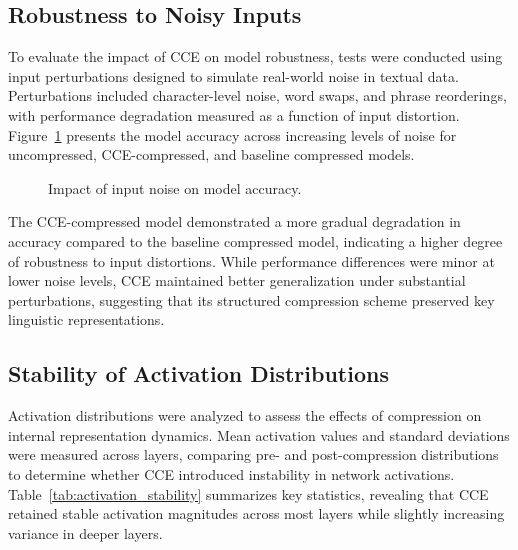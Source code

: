 \documentclass{article}
\begin{document}
\subsection{Robustness to Noisy Inputs}

To evaluate the impact of CCE on model robustness, tests were conducted using input perturbations designed to simulate real-world noise in textual data. Perturbations included character-level noise, word swaps, and phrase reorderings, with performance degradation measured as a function of input distortion. Figure~\ref{fig:noise_robustness} presents the model accuracy across increasing levels of noise for uncompressed, CCE-compressed, and baseline compressed models.

\begin{figure}[t]
	\centering
	\caption{Impact of input noise on model accuracy.}
	\label{fig:noise_robustness}
\end{figure}

The CCE-compressed model demonstrated a more gradual degradation in accuracy compared to the baseline compressed model, indicating a higher degree of robustness to input distortions. While performance differences were minor at lower noise levels, CCE maintained better generalization under substantial perturbations, suggesting that its structured compression scheme preserved key linguistic representations.

\subsection{Stability of Activation Distributions}

Activation distributions were analyzed to assess the effects of compression on internal representation dynamics. Mean activation values and standard deviations were measured across layers, comparing pre- and post-compression distributions to determine whether CCE introduced instability in network activations. Table~\ref{tab:activation_stability} summarizes key statistics, revealing that CCE retained stable activation magnitudes across most layers while slightly increasing variance in deeper layers.
\end{document}

